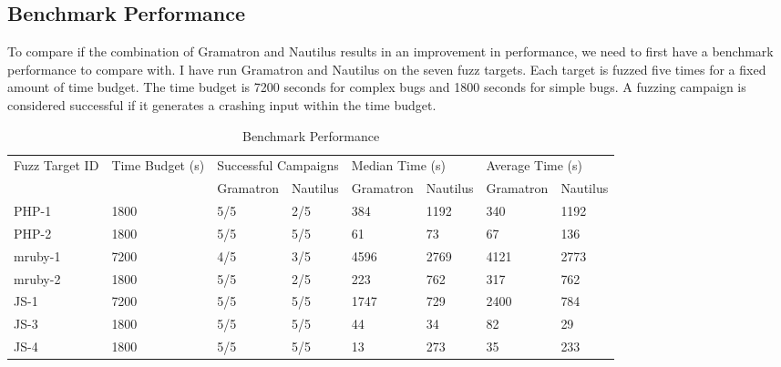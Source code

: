\subsection{Benchmark Performance}
To compare if the combination of Gramatron and Nautilus results in an improvement in performance, we need to first have a benchmark performance to compare with. I have run Gramatron and Nautilus on the seven fuzz targets. Each target is fuzzed five times for a fixed amount of time budget. The time budget is 7200 seconds for complex bugs and 1800 seconds for simple bugs. A fuzzing campaign is considered successful if it generates a crashing input within the time budget. 

\begin{table*}[]
\centering
\caption{Benchmark Performance}
\begin{tabular}{llllllll}
\hline
\multirow{2}{*}{Fuzz Target ID} & \multirow{2}{*}{Time Budget (s)} & \multicolumn{2}{l}{Successful Campaigns} & \multicolumn{2}{l}{Median Time (s)} & \multicolumn{2}{l}{Average Time (s)} \\
                                &                                  & Gramatron           & Nautilus           & Gramatron         & Nautilus        & Gramatron         & Nautilus         \\ \hline
PHP-1                           & 1800                             & 5/5                 & 2/5                & 384               & 1192            & 340               & 1192             \\
PHP-2                           & 1800                             & 5/5                 & 5/5                & 61                & 73              & 67                & 136              \\
mruby-1                         & 7200                             & 4/5                 & 3/5                & 4596              & 2769            & 4121              & 2773             \\
mruby-2                         & 1800                             & 5/5                 & 2/5                & 223               & 762             & 317               & 762              \\
JS-1                            & 7200                             & 5/5                 & 5/5                & 1747              & 729             & 2400              & 784              \\
JS-3                            & 1800                             & 5/5                 & 5/5                & 44                & 34              & 82                & 29               \\
JS-4                            & 1800                             & 5/5                 & 5/5                & 13                & 273             & 35                & 233              \\ \hline
\end{tabular}
\label{tab:benchmark}
\end{table*}
